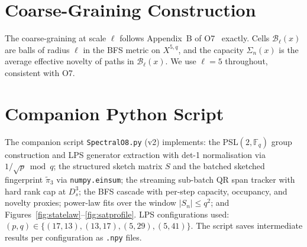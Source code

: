 \documentclass[11pt,a4paper]{article}
\theoremstyle{definition}
\theoremstyle{remark}
\newcommand{\Sigman}{\Sigma_n}
\begin{document}
  \section{Coarse-Graining Construction}
  \label{app:coarse}

  The coarse-graining at scale $\ell$ follows Appendix~B of O7~\cite{Beau2026a11}
  exactly.
  Cells $\mathcal{B}_\ell(x)$ are balls of radius $\ell$ in the BFS metric on $X^{5,q}$,
  and the capacity $\Sigman(x)$ is the average effective novelty of paths in
  $\mathcal{B}_\ell(x)$.
  We use $\ell = 5$ throughout, consistent with O7.

  \section{Companion Python Script}
  \label{app:script}

  The companion script \texttt{SpectralO8.py} (v2) implements:
  the PSL$(2,\mathbb{F}_q)$ group construction and LPS generator extraction
  with det-1 normalisation via $1/\sqrt{p} \bmod q$;
  the structured sketch matrix $S$ and the batched sketched fingerprint
  $\tilde\pi_3$ via \texttt{numpy.einsum};
  the streaming sub-batch QR span tracker with hard rank cap at $D_s^3$;
  the BFS cascade with per-step capacity, occupancy, and novelty proxies;
  power-law fits over the window $|S_n| \leq q^2$;
  and Figures~\ref{fig:statelaw}--\ref{fig:satprofile}.
  LPS configurations used: $(p,q) \in \{(17,13),(13,17),(5,29),(5,41)\}$.
  The script saves intermediate results per configuration as \texttt{.npy} files.

  \clearpage
  
      
\end{document}
